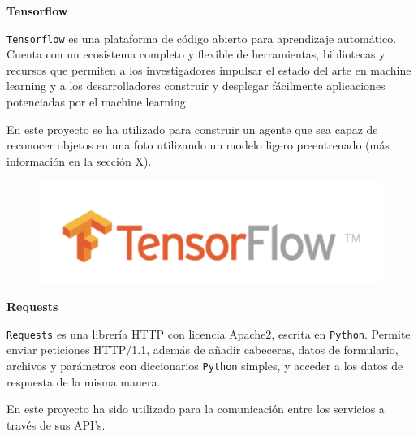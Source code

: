 \vspace{-0.6cm}

\textbf{Tensorflow}

\texttt{Tensorflow}  es una plataforma de código abierto para aprendizaje automático. Cuenta con un ecosistema completo y flexible de herramientas, bibliotecas y recursos que permiten a los investigadores impulsar el estado del arte en machine learning y a los desarrolladores construir y desplegar fácilmente aplicaciones potenciadas por el machine learning.

En este proyecto se ha utilizado para construir un agente que sea capaz de reconocer objetos en una foto utilizando un modelo ligero preentrenado (más información en la sección X).

\begin{figure}[h]
	\centering
	\includegraphics[scale=0.12]{images/19}
\end{figure}

\textbf{Requests}

\texttt{Requests} \cite{ref18} es una librería HTTP con licencia Apache2, escrita en \texttt{Python}. Permite enviar peticiones HTTP/1.1, además de añadir cabeceras, datos de formulario, archivos y parámetros con diccionarios \texttt{Python} simples, y acceder a los datos de respuesta de la misma manera.

En este proyecto ha sido utilizado para la comunicación entre los servicios a través de sus API's.

